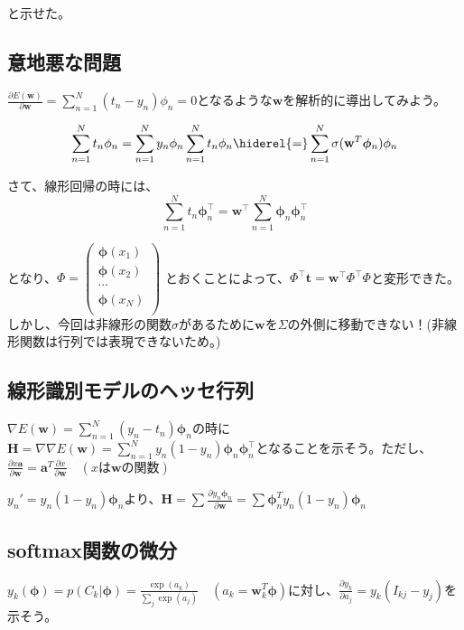と示せた。

\subsection*{意地悪な問題}
$\frac{\partial E(\mathbf{w})}{\partial \mathbf{w}} =  \sum_{n=1}^N (t_n - y_n) \phi_n = 0$となるような$\mathbf{w}$を解析的に導出してみよう。

\begin{dmath*}
\sum_{n=1}^N t_n \phi_n = \sum_{n=1}^N y_n \phi_n \\
\sum_{n=1}^N t_n \phi_n \hiderel{=} \sum_{n=1}^N  \sigma(\mathbf{w}^T \bm{\phi}_n) \phi_n
\end{dmath*}

さて、線形回帰の時には、
\begin{equation}
	\sum_{n=1}^N t_n \bm{\phi}_n^{\top} =  \mathbf{w}^{\top} \sum_{n=1}^N \bm{\phi}_n \bm{\phi}_n^{\top}
\end{equation}

となり、$\Phi = \begin{pmatrix} 
\bm{\phi}(x_1) \\
\bm{\phi}(x_2) \\
\cdots \\
\bm{\phi}(x_N) \\
\end{pmatrix}$ とおくことによって、$\Phi^{\top} \mathbf{t} = \mathbf{w}^{\top} \Phi^{\top} \Phi$と変形できた。しかし、今回は非線形の関数$\sigma$があるために$\mathbf{w}$を$\Sigma$の外側に移動できない！(非線形関数は行列では表現できないため。)


\subsection*{線形識別モデルのヘッセ行列}

$\nabla E (\mathbf{w} ) = \sum_{n=1}^N (y_n - t_n) \bm{\phi}_n $の時に$\mathbf{H} = \nabla \nabla E(\mathbf{w}) = \sum_{n=1}^N y_n (1 - y_n) \bm{\phi}_n \bm{\phi}_n^{\top}$となることを示そう。ただし、$\frac{\partial x \mathbf{a}}{\partial \mathbf{w}} = \mathbf{a}^T \frac{\partial x}{\partial \mathbf{w}} \quad (x \text{は} \mathbf{w} \text{の関数})$

$y_n' = y_n(1-y_n)\bm{\phi}_n$より、$\mathbf{H} = \sum \frac{\partial  y_n \bm{\phi}_n}{\partial \mathbf{w}} = \sum \bm{\phi}_n^T y_n(1 - y_n) {\bm{\phi}_n}$

\subsection*{softmax関数の微分}
$ y_k(\bm{\phi})  =  p(C_k | \bm{\phi}) = \frac{\exp(a_{k})}{\sum_j \exp(a_{j}) } \quad (a_k = \mathbf{w}_k^T \bm{\phi}) $に対し、$\frac{\partial y_k}{\partial a_j} = y_k (I_{kj} - y_j)$を示そう。

